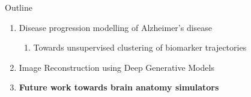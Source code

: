 \documentclass[8pt,xcolor=table,aspectratio=169]{beamer}
\begin{document}
\begin{frame}{Outline}

\begin{enumerate}
 \item Disease progression modelling of Alzheimer's disease
 \begin{enumerate} 
  \item Towards unsupervised clustering of biomarker trajectories\\
 \end{enumerate}
   
 
  
  \vt

 \item Image Reconstruction using Deep Generative Models\\
\brgmoursshort
\vt
 
  \item \textbf{Future work towards brain anatomy simulators}\\

\end{enumerate}
\end{frame}
\end{document}
